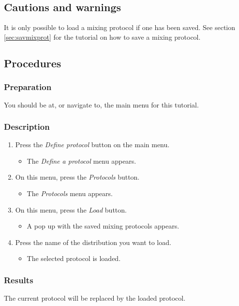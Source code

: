 \subsection{Cautions and warnings}
It is only possible to load a mixing protocol if one has been saved. See section \ref{sec:savmixprot} for the tutorial on how to save a mixing protocol.

\subsection{Procedures}
\subsubsection{Preparation}
You should be at, or navigate to, the main menu for this tutorial.

\subsubsection{Description}
\begin{enumerate}
	\item Press the \emph{Define protocol} button on the main menu.
		\begin{itemize}
            \item The \emph{Define a protocol} menu appears.
		\end{itemize}
	\item On this menu, press the \emph{Protocols} button. 
		\begin{itemize}
             \item The \emph{Protocols} menu appears. 
		\end{itemize}
	\item On this menu, press the \emph{Load} button. 
		\begin{itemize}
            \item A pop up with the saved mixing protocols appears. 
		\end{itemize}
    \item Press the name of the distribution you want to load.
   		\begin{itemize}
            \item The selected protocol is loaded.
		\end{itemize}
\end{enumerate}

\subsubsection{Results}
The current protocol will be replaced by the loaded protocol.

